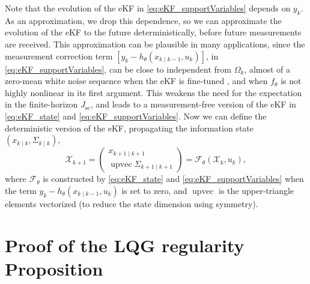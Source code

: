 \documentclass[twocolumn,amsthm]{autart}
\begin{document}
Note that the evolution of the eKF in \eqref{eq:eKF_supportVariables} depends on $y_k$. As an approximation, we drop this dependence, so we can approximate the evolution of the eKF to the future deterministically, before future measurements are received. This approximation can be plausible in many applications, since the measurement correction term $[y_{k} - h_\theta(x_{k\mid k-1}, u_k)]$, in \eqref{eq:eKF_supportVariables}, can be close to independent from $\Omega_{k}$, almost of a zero-mean white noise sequence when the eKF is fine-tuned \cite[Sec.~8.2]{anderson2012optimal}, and when $f_\theta$ is not highly nonlinear in its first argument. This weakens the need for the expectation in the finite-horizon $J_{\mathrm{sc}}$, and leads to a measurement-free version of the eKF in \eqref{eq:eKF_state} and \eqref{eq:eKF_supportVariables}. Now we can define the deterministic version of the eKF, propagating the information state $(x_{k \mid k}, \Sigma_{k \mid k})$,
\begin{equation*}
\mathcal{X}_{k+1} = 
\begin{pmatrix}
    x_{k+1 \mid k+1} \\
    \operatorname{upvec}\Sigma_{k+1 \mid k+1}
\end{pmatrix}
     = \mathcal{F}_\theta(\mathcal{X}_k, u_k),
\end{equation*}
where $\mathcal{F}_\theta$ is constructed by \eqref{eq:eKF_state} and \eqref{eq:eKF_supportVariables} when the term $y_k - h_\theta(x_{k \mid k-1},u_k)$ is set to zero, and $\operatorname{upvec}$ is the upper-triangle elements vectorized (to reduce the state dimension using symmetry). 



\section{Proof of the LQG regularity Proposition}\label{app:lqgreg}
\end{document}

